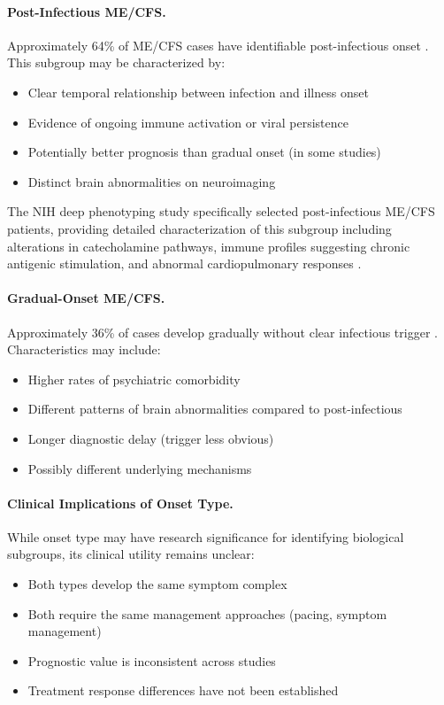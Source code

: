 \paragraph{Post-Infectious ME/CFS.}
Approximately 64\% of ME/CFS cases have identifiable post-infectious onset \cite{Jason2019onset}. This subgroup may be characterized by:
\begin{itemize}
    \item Clear temporal relationship between infection and illness onset
    \item Evidence of ongoing immune activation or viral persistence
    \item Potentially better prognosis than gradual onset (in some studies)
    \item Distinct brain abnormalities on neuroimaging
\end{itemize}

The NIH deep phenotyping study specifically selected post-infectious ME/CFS patients, providing detailed characterization of this subgroup including alterations in catecholamine pathways, immune profiles suggesting chronic antigenic stimulation, and abnormal cardiopulmonary responses \cite{walitt2024deep}.

\paragraph{Gradual-Onset ME/CFS.}
Approximately 36\% of cases develop gradually without clear infectious trigger \cite{Jason2019onset}. Characteristics may include:
\begin{itemize}
    \item Higher rates of psychiatric comorbidity
    \item Different patterns of brain abnormalities compared to post-infectious
    \item Longer diagnostic delay (trigger less obvious)
    \item Possibly different underlying mechanisms
\end{itemize}

\paragraph{Clinical Implications of Onset Type.}
While onset type may have research significance for identifying biological subgroups, its clinical utility remains unclear:
\begin{itemize}
    \item Both types develop the same symptom complex
    \item Both require the same management approaches (pacing, symptom management)
    \item Prognostic value is inconsistent across studies
    \item Treatment response differences have not been established
\end{itemize}

